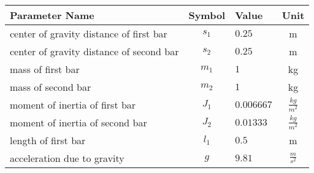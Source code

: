 \begin{tabular}{lclc}
\hline
 Parameter Name                           &  Symbol  & Value      &       Unit       \\
\hline
 center of gravity distance of first bar  & $s_{1}$  & $0.25$     &        m         \\
 center of gravity distance of second bar & $s_{2}$  & $0.25$     &        m         \\
 mass of first bar                        & $m_{1}$  & $1$        &        kg        \\
 mass of second bar                       & $m_{2}$  & $1$        &        kg        \\
 moment of inertia of first bar           & $J_{1}$  & $0.006667$ & $\frac{kg}{m^2}$ \\
 moment of inertia of second bar          & $J_{2}$  & $0.01333$  & $\frac{kg}{m^2}$ \\
 length of first bar                      & $l_{1}$  & $0.5$      &        m         \\
 acceleration due to gravity              &   $g$    & $9.81$     & $\frac{m}{s^2}$  \\
\hline
\end{tabular}
